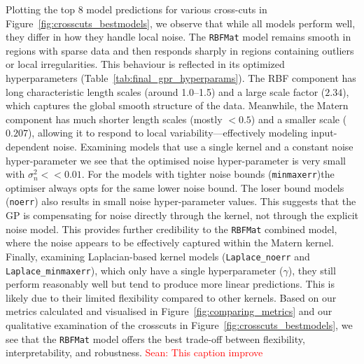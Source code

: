 \documentclass{ucdgradtaughtthesis}
\newcommand{\Sean}[1]{{\textcolor{red}{{Sean: #1}} }}
\begin{document}
Plotting the top 8 model predictions for various cross-cuts in Figure~\ref{fig:crosscuts_bestmodels}, we observe that while all models perform well, they differ in how they handle local noise.
The \texttt{RBFMat} model remains smooth in regions with sparse data and then responds sharply in regions containing outliers or local irregularities.
This behaviour is reflected in its optimized hyperparameters (Table~\ref{tab:final_gpr_hyperparams}). The RBF component has long characteristic length scales (around 1.0--1.5) and a large scale factor ($2.34$),
which captures the global smooth structure of the data. Meanwhile, the Matern component has much shorter length scales (mostly $< 0.5$) and a smaller scale ($0.207$), allowing it to respond to local variability—effectively modeling input-dependent noise.
Examining models that use a single kernel and a constant noise hyper-parameter we see that the optimised noise hyper-parameter is very small with \(\sigma_n^2 << 0.01\). For the models with tighter noise bounds (\texttt{minmaxerr})the optimiser always opts for the same lower noise bound. The loser bound models (\texttt{noerr})
also results in small noise hyper-parameter values. This suggests that the GP is compensating for noise directly through the kernel, not through the explicit noise model. This provides further credibility to the \texttt{RBFMat} combined model, where the noise appears to be effectively captured within the Matern kernel.
Finally, examining Laplacian-based kernel models (\texttt{Laplace\_noerr} and \texttt{Laplace\_minmaxerr}), which only have a single hyperparameter ($\gamma$), they still perform reasonably well but tend to produce more linear predictions. This is likely due to their limited flexibility compared to other kernels.
Based on our metrics calculated and visualised in Figure~\ref{fig:comparing_metrics} and our qualitative examination of the crosscuts in Figure~\ref{fig:crosscuts_bestmodels}, we see that the \texttt{RBFMat} model offers the best trade-off between flexibility, interpretability, and robustness.
\Sean{This caption improve}
\end{document}
